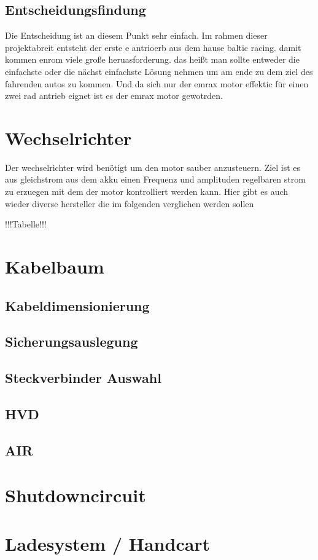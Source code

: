 \subsection{Entscheidungsfindung}

Die Entscheidung ist an diesem Punkt sehr einfach. Im rahmen dieser projektabreit entsteht der erste e antrioerb aus dem hause baltic racing. damit kommen enrom viele große heruasforderung. das heißt man sollte entweder die einfachste oder die nächst einfachste Lösung nehmen um am ende zu dem ziel des fahrenden autos zu kommen. Und da sich nur der emrax motor effektic für einen zwei rad antrieb eignet ist es der emrax motor gewotrden.

\section{Wechselrichter}
Der wechselrichter wird benötigt um den motor sauber anzusteuern. Ziel ist es aus gleichstrom aus dem akku einen Frequenz und amplituden regelbaren strom zu erzuegen mit dem der motor kontrolliert werden kann. Hier gibt es auch wieder diverse hersteller die im folgenden verglichen werden sollen


!!!Tabelle!!!





\section{Kabelbaum}

\subsection{Kabeldimensionierung}

\subsection{Sicherungsauslegung}

\subsection{Steckverbinder Auswahl}

\subsection{HVD}

\subsection{AIR}

\section{Shutdowncircuit}

\section{Ladesystem / Handcart}


